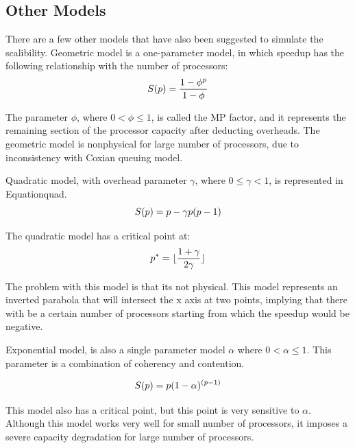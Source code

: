 \vspace{\baselineskip}
\subsection{Other Models}	
There are a few other models that have also been suggested to simulate the scalibility. Geometric model is a one-parameter model, in which speedup has the following relationship with the number of processors:
\begin{equation}\label{geo}
S(p) = \frac{1-\phi^{p}}{1-\phi}\\
\end{equation}

The parameter $\phi$, where $0<\phi\leqslant1$, is called the MP factor, and it represents the remaining section of the processor capacity after deducting overheads. 
The geometric model is nonphysical for large number of processors, due to inconsistency with Coxian queuing model\cite{gunther2002new}. 

Quadratic model\cite{gunther2000practical}, with overhead parameter $\gamma$, where $0	\leqslant\gamma<1$, is represented in Equation{quad}.
\begin{equation}\label{quad}
S(p) = p-\gamma{p(p-1)}\\
\end{equation}

The quadratic model has a critical point at: 
\begin{equation}\label{quad_critical}
p^* = \lfloor\frac{1+\gamma}{2\gamma}\rfloor \\
\end{equation}

The problem with this model is that its not physical. This model represents an inverted parabola that will intersect the x axis at two points, implying that there with be a certain number of processors starting from which the speedup would be negative. 


Exponential model, is also a single parameter model $\alpha$ where $0<\alpha\leqslant1$. This parameter is a combination of coherency and contention. 

\begin{equation}\label{expo}
S(p) = p(1-\alpha)^{(p-1)}\\
\end{equation}

This model also has a critical point, but this point is very sensitive to $\alpha$. Although this model works very well for small number of processors, it imposes a severe capacity degradation for large number of processors.

